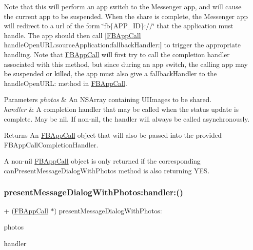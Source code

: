 Note that this will perform an app switch to the Messenger app, and will cause the current app to be suspended. When the share is complete, the Messenger app will redirect to a url of the form \char`\"{}fb\{\+A\+P\+P\+\_\+\+I\+D\}\+://\char`\"{} that the application must handle. The app should then call \mbox{[}\hyperlink{interfaceFBAppCall}{F\+B\+App\+Call} handle\+Open\+U\+R\+L\+:source\+Application\+:fallback\+Handler\+:\mbox{]} to trigger the appropriate handling. Note that \hyperlink{interfaceFBAppCall}{F\+B\+App\+Call} will first try to call the completion handler associated with this method, but since during an app switch, the calling app may be suspended or killed, the app must also give a fallback\+Handler to the handle\+Open\+U\+RL\+: method in \hyperlink{interfaceFBAppCall}{F\+B\+App\+Call}.


\begin{DoxyParams}{Parameters}
{\em photos} & An N\+S\+Array containing U\+I\+Images to be shared.\\
\hline
{\em handler} & A completion handler that may be called when the status update is complete. May be nil. If non-\/nil, the handler will always be called asynchronously.\\
\hline
\end{DoxyParams}
\begin{DoxyReturn}{Returns}
An \hyperlink{interfaceFBAppCall}{F\+B\+App\+Call} object that will also be passed into the provided F\+B\+App\+Call\+Completion\+Handler.
\end{DoxyReturn}
A non-\/nil \hyperlink{interfaceFBAppCall}{F\+B\+App\+Call} object is only returned if the corresponding {\ttfamily can\+Present\+Message\+Dialog\+With\+Photos} method is also returning Y\+ES. \mbox{\label{interfaceFBDialogs_a47a8fb26e758e8b8da4843ce641a3fe6}} 
\subsubsection{\texorpdfstring{present\+Message\+Dialog\+With\+Photos\+:handler\+:()}{presentMessageDialogWithPhotos:handler:()}\hspace{0.1cm}{\footnotesize\ttfamily [2/5]}}
{\footnotesize\ttfamily + (\hyperlink{interfaceFBAppCall}{F\+B\+App\+Call} $\ast$) present\+Message\+Dialog\+With\+Photos\+: \begin{DoxyParamCaption}\item[{(N\+S\+Array $\ast$)}]{photos }\item[{handler:(F\+B\+Dialog\+App\+Call\+Completion\+Handler)}]{handler }\end{DoxyParamCaption}}

